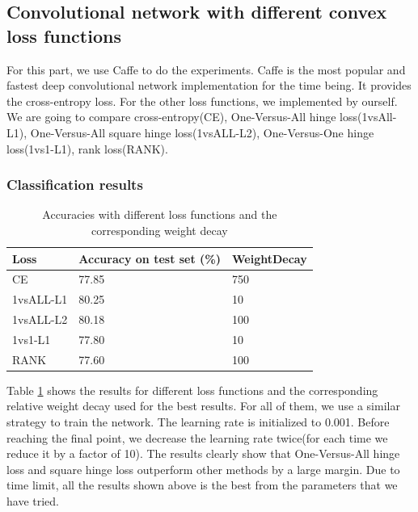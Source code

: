 \documentclass{article} %
\begin{document}
\subsection{Convolutional network with different convex loss functions}
For this part, we use Caffe to do the experiments. Caffe is the most popular and fastest deep convolutional network implementation for the time being. It provides the cross-entropy loss. For the other loss functions, we implemented by ourself. We are going to compare cross-entropy(CE), One-Versus-All hinge loss(1vsAll-L1), One-Versus-All square hinge loss(1vsALL-L2), One-Versus-One hinge loss(1vs1-L1), rank loss(RANK).
\subsubsection{Classification results}
\begin{table}
\centering 
    \begin{tabular}{l|l|l}
    \hline
    Loss     & Accuracy on test set (\%) & WeightDecay\\ \hline
    CE     & 77.85  &      750         \\ \hline
    1vsALL-L1 & 80.25  &   10            \\ \hline
    1vsALL-L2 &  80.18       &    100         \\ \hline
    1vs1-L1 &   77.80       &     10         \\ \hline
    RANK    &   77.60       &    100          \\ \hline
    \end{tabular}
     \caption{Accuracies with different loss functions and the corresponding weight decay}   
     \label{table2}
\end{table}
Table \ref{table2} shows the results for different loss functions and the corresponding relative weight decay used for the best results. For all of them, we use a similar strategy to train the network. The learning rate is initialized to 0.001. Before reaching the final point, we decrease the learning rate twice(for each time we reduce it by a factor of 10). The results clearly show that One-Versus-All hinge loss and square hinge loss outperform other methods by a large margin. Due to time limit, all the results shown above is the best from the parameters that we have
tried. 
\end{document}
